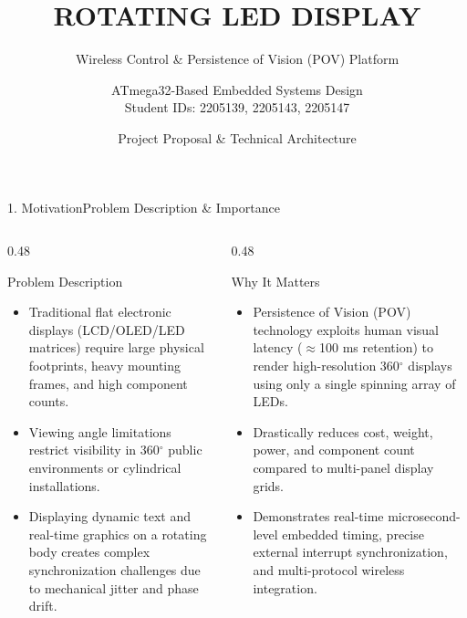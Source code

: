 \documentclass[aspectratio=169, 10pt]{beamer}
\title{ROTATING LED DISPLAY}
\subtitle{Wireless Control \& Persistence of Vision (POV) Platform}
\author{ATmega32-Based Embedded Systems Design \\ Student IDs: 2205139, 2205143, 2205147}
\date{Project Proposal \& Technical Architecture}
\begin{document}
\begin{frame}
    \titlepage
\end{frame}

\begin{frame}{1. Motivation}{Problem Description \& Importance}
    \begin{columns}[T]
        \begin{column}{0.48\textwidth}
            \begin{block}{Problem Description}
                \small
                \begin{itemize}
                    \item Traditional flat electronic displays (LCD/OLED/LED matrices) require large physical footprints, heavy mounting frames, and high component counts.
                    \item Viewing angle limitations restrict visibility in 360$^\circ$ public environments or cylindrical installations.
                    \item Displaying dynamic text and real-time graphics on a rotating body creates complex synchronization challenges due to mechanical jitter and phase drift.
                \end{itemize}
            \end{block}
        \end{column}
        \begin{column}{0.48\textwidth}
            \begin{block}{Why It Matters}
                \small
                \begin{itemize}
                    \item Persistence of Vision (POV) technology exploits human visual latency ($\approx$100 ms retention) to render high-resolution 360$^\circ$ displays using only a single spinning array of LEDs.
                    \item Drastically reduces cost, weight, power, and component count compared to multi-panel display grids.
                    \item Demonstrates real-time microsecond-level embedded timing, precise external interrupt synchronization, and multi-protocol wireless integration.
                \end{itemize}
            \end{block}
        \end{column}
    \end{columns}
\end{frame}
\end{document}
